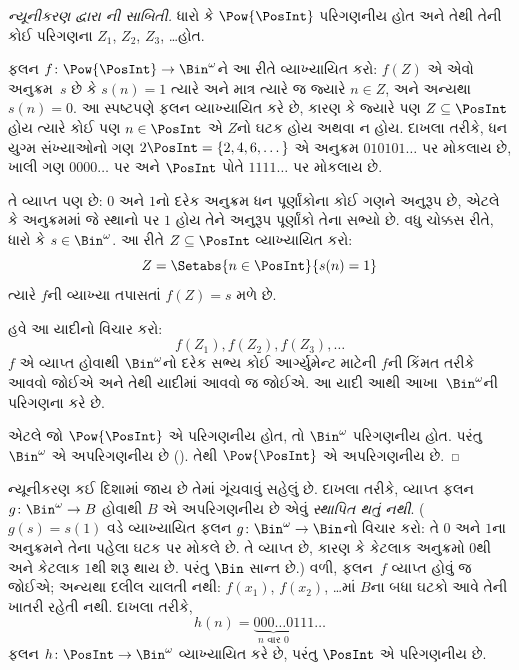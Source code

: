 \begin{proof}[ન્યૂનીકરણ દ્વારા {}ની સાબિતી]
ધારો કે $\Pow{\PosInt}$ પરિગણનીય હોત અને તેથી તેની કોઈ
પરિગણના $Z_{1}$, $Z_{2}$, $Z_{3}$, \dots હોત.

ફલન $f \colon \Pow{\PosInt} \to \Bin^\omega$ને આ રીતે
વ્યાખ્યાયિત કરો: $f(Z)$ એ એવો અનુક્રમ~$s$ છે કે
$s(n) = 1$ ત્યારે અને માત્ર ત્યારે જ જ્યારે $n \in Z$, અને
અન્યથા $s(n) = 0$. આ સ્પષ્ટપણે ફલન વ્યાખ્યાયિત કરે છે,
કારણ કે જ્યારે પણ $Z \subseteq \PosInt$ હોય ત્યારે કોઈ પણ
$n \in \PosInt$ એ $Z$નો ઘટક હોય અથવા ન હોય.
દાખલા તરીકે, ધન યુગ્મ સંખ્યાઓનો ગણ $2\PosInt = \{2,
4, 6, \dots\}$ એ અનુક્રમ $010101\dots$ પર મોકલાય છે,
ખાલી ગણ $0000\dots$ પર અને $\PosInt$ પોતે $1111\dots$ પર મોકલાય છે.

તે વ્યાપ્ત પણ છે: $0$ અને $1$નો દરેક અનુક્રમ ધન
પૂર્ણાંકોના કોઈ ગણને અનુરૂપ છે, એટલે કે અનુક્રમમાં જે સ્થાનો પર
$1$ હોય તેને અનુરૂપ પૂર્ણાંકો તેના સભ્યો છે. વધુ ચોક્કસ રીતે,
ધારો કે $s \in \Bin^\omega$. આ રીતે $Z \subseteq \PosInt$
વ્યાખ્યાયિત કરો:
\[
Z = \Setabs{n \in \PosInt}{s(n) = 1}
\]
ત્યારે $f$ની વ્યાખ્યા તપાસતાં $f(Z) = s$ મળે છે.

હવે આ યાદીનો વિચાર કરો:
\[
f(Z_1), f(Z_2), f(Z_3), \dots
\]
$f$ એ વ્યાપ્ત હોવાથી $\Bin^\omega$નો દરેક સભ્ય કોઈ
આર્ગ્યુમેન્ટ માટેની $f$ની કિંમત તરીકે આવવો જોઈએ અને તેથી યાદીમાં આવવો જ
જોઈએ. આ યાદી આથી આખા~$\Bin^\omega$ની પરિગણના કરે છે.

એટલે જો $\Pow{\PosInt}$ એ પરિગણનીય હોત, તો $\Bin^\omega$
પરિગણનીય હોત. પરંતુ $\Bin^\omega$ એ અપરિગણનીય છે
(). તેથી $\Pow{\PosInt}$ એ
અપરિગણનીય છે.
\end{proof}

\begin{explain}
ન્યૂનીકરણ કઈ દિશામાં જાય છે તેમાં ગૂંચવાવું સહેલું છે.
દાખલા તરીકે, વ્યાપ્ત ફલન $g \colon \Bin^\omega \to B$
હોવાથી $B$ એ અપરિગણનીય છે એવું \emph{સ્થાપિત થતું નથી}.
($g(s) = s(1)$ વડે વ્યાખ્યાયિત ફલન
$g \colon \Bin^\omega \to \Bin$નો વિચાર કરો: તે $0$ અને $1$ના
અનુક્રમને તેના પહેલા ઘટક પર મોકલે છે. તે વ્યાપ્ત છે,
કારણ કે કેટલાક અનુક્રમો $0$થી અને કેટલાક $1$થી શરૂ થાય છે.
પરંતુ $\Bin$ સાન્ત છે.) વળી, ફલન~$f$ વ્યાપ્ત હોવું જ
જોઈએ; અન્યથા દલીલ ચાલતી નથી: $f(x_1)$, $f(x_2)$, \dots{}માં
$B$ના બધા ઘટકો આવે તેની ખાતરી રહેતી નથી. દાખલા તરીકે,
\[
h(n) = \underbrace{000\dots0}_{\text{$n$ વાર $0$}}111\dots
\]
ફલન $h\colon \PosInt \to \Bin^\omega$ વ્યાખ્યાયિત કરે છે,
પરંતુ $\PosInt$ એ પરિગણનીય છે.
\end{explain}

